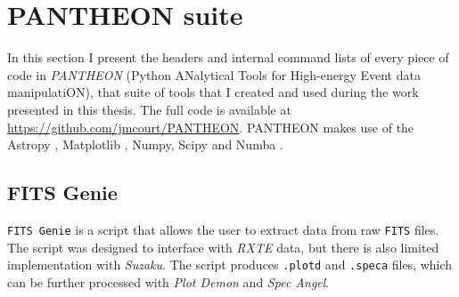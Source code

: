 \chapter{PANTHEON suite}

\label{app:PAN}

\par In this section I present the headers and internal command lists of every piece of code in \textit{PANTHEON} (Python ANalytical Tools for High-energy Event data manipulatiON), that suite of tools that I created and used during the work presented in this thesis.  The full code is available at \url{https://github.com/jmcourt/PANTHEON}.  PANTHEON makes use of the Astropy \citep{Astropy}, Matplotlib \citep{Hunter_MatPlotLib}, Numpy, Scipy \citep{NumPy} and Numba \citep{Numba}.

\section{FITS Genie}

\par \texttt{FITS Genie} is a script that allows the user to extract data from raw \texttt{FITS} files.  The script was designed to interface with \indexrxte\textit{RXTE} data, but there is also limited implementation with \indexsuzaku\textit{Suzaku}.  The script produces \texttt{.plotd} and \texttt{.speca} files, which can be further processed with \textit{Plot Demon} and \textit{Spec Angel}.

